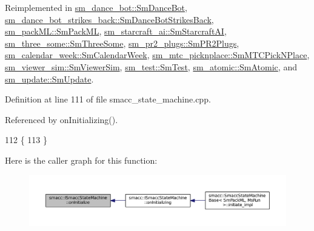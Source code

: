 Reimplemented in \hyperlink{structsm__dance__bot_1_1SmDanceBot_a1baf6710e3e4755483e1e8441bb0f910}{sm\+\_\+dance\+\_\+bot\+::\+Sm\+Dance\+Bot}, \hyperlink{structsm__dance__bot__strikes__back_1_1SmDanceBotStrikesBack_ad6a9ef45cc05cb6fed4550f2f04d4a3e}{sm\+\_\+dance\+\_\+bot\+\_\+strikes\+\_\+back\+::\+Sm\+Dance\+Bot\+Strikes\+Back}, \hyperlink{structsm__packML_1_1SmPackML_a63aa0e31bcdf6c9584011d14bc6ec8af}{sm\+\_\+pack\+M\+L\+::\+Sm\+Pack\+ML}, \hyperlink{structsm__starcraft__ai_1_1SmStarcraftAI_a16d8896df860ce9098a7eb7ccce90a4c}{sm\+\_\+starcraft\+\_\+ai\+::\+Sm\+Starcraft\+AI}, \hyperlink{structsm__three__some_1_1SmThreeSome_ac811ac731023ccbab1db358d0efa1c0e}{sm\+\_\+three\+\_\+some\+::\+Sm\+Three\+Some}, \hyperlink{structsm__pr2__plugs_1_1SmPR2Plugs_acfafd0eeb3863f00a79704f656d4f4c6}{sm\+\_\+pr2\+\_\+plugs\+::\+Sm\+P\+R2\+Plugs}, \hyperlink{structsm__calendar__week_1_1SmCalendarWeek_a4c01af9a3190d10d3794e82bd087e121}{sm\+\_\+calendar\+\_\+week\+::\+Sm\+Calendar\+Week}, \hyperlink{structsm__mtc__picknplace_1_1SmMTCPickNPlace_aa5007775308c85c2f45302d7e3ff5837}{sm\+\_\+mtc\+\_\+picknplace\+::\+Sm\+M\+T\+C\+Pick\+N\+Place}, \hyperlink{structsm__viewer__sim_1_1SmViewerSim_a1ad4e963a078af53a55097c6eb78cae0}{sm\+\_\+viewer\+\_\+sim\+::\+Sm\+Viewer\+Sim}, \hyperlink{structsm__test_1_1SmTest_afc961fbf2c09cd83a112875ba290795c}{sm\+\_\+test\+::\+Sm\+Test}, \hyperlink{structsm__atomic_1_1SmAtomic_ac87a3d5a78eb48b949b3948f9ce28d24}{sm\+\_\+atomic\+::\+Sm\+Atomic}, and \hyperlink{structsm__update_1_1SmUpdate_a760548839a6feee77250ca1d97db7da1}{sm\+\_\+update\+::\+Sm\+Update}.



Definition at line 111 of file smacc\+\_\+state\+\_\+machine.\+cpp.



Referenced by on\+Initializing().


\begin{DoxyCode}
112 \{
113 \}
\end{DoxyCode}


Here is the caller graph for this function\+:
\nopagebreak
\begin{figure}[H]
\begin{center}
\leavevmode
\includegraphics[width=350pt]{classsmacc_1_1ISmaccStateMachine_ac2982c6c8283663e5e1e8a7c82f511ec_icgraph}
\end{center}
\end{figure}


